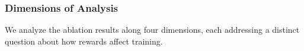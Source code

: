 \subsubsection{Dimensions of Analysis}
\label{sec:dimensions}
\nestindent

We analyze the ablation results along four dimensions, each addressing a distinct question about how rewards affect training.


\nestunindent
